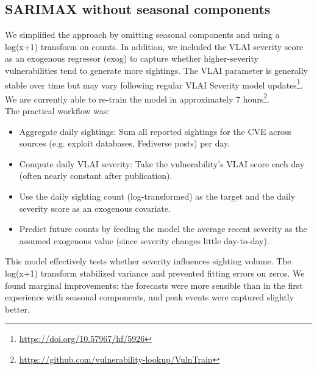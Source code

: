 \documentclass[]{article}
\begin{document}
%


\subsection{SARIMAX without seasonal components}
We simplified the approach by omitting seasonal components and using a log(x+1) transform on counts. In addition, we included the VLAI severity score as an exogenous regressor (exog) to capture whether higher-severity vulnerabilities tend to generate more sightings. The VLAI parameter is generally stable over time but may vary following regular VLAI Severity model
updates\footnote{\scriptsize \url{https://doi.org/10.57967/hf/5926}}.
We are currently able to re-train the model in approximately 7 hours\footnote{\scriptsize \url{https://github.com/vulnerability-lookup/VulnTrain}}.\\
The practical workflow was:

\begin{itemize}
    \item Aggregate daily sightings: Sum all reported sightings for the CVE across sources (e.g. exploit databases, Fediverse posts) per day.
    \item Compute daily VLAI severity: Take the vulnerability’s VLAI score each day (often nearly constant after publication).
    \item Use the daily sighting count (log-transformed) as the target and the daily severity score as an exogenous covariate.
    \item Predict future counts by feeding the model the average recent severity as the assumed exogenous value (since severity changes little day-to-day).
\end{itemize}

This model effectively tests whether severity influences sighting volume. The log(x+1) transform stabilized variance and prevented fitting errors on zeros. We found marginal improvements: the forecasts were more sensible than in the first experience with seasonal components, and peak events were captured slightly better.
\end{document}
